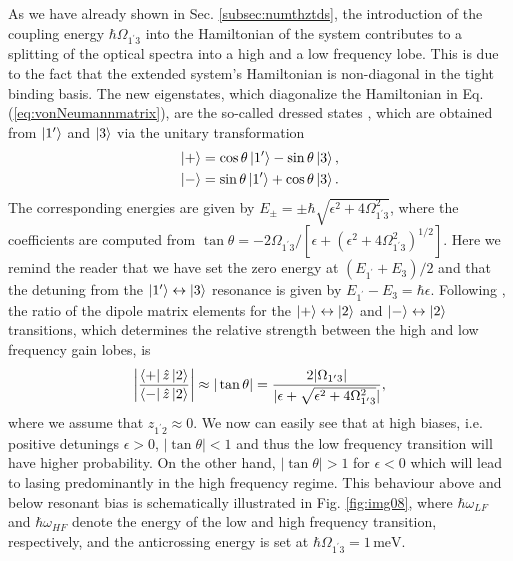 \documentclass[10pt,letterpaper]{article}%
\begin{document}
\begin{appendices}
As we have already shown in Sec. \ref{subsec:numthztds}, the introduction of
the coupling energy $\hbar\Omega_{1^{\prime}3}$ into the Hamiltonian of the
system contributes to a splitting of the optical spectra into a high and a low
frequency lobe. This is due to the fact that the extended system's Hamiltonian
is non-diagonal in the tight binding basis. The new eigenstates, which
diagonalize the Hamiltonian in Eq. (\ref{eq:vonNeumannmatrix}), are the
so-called dressed states \cite{callebaut2005importance,dupont2010simplified},
which are obtained from $\Ket{1'}$ and $\Ket{3}$ via the unitary
transformation
\begin{align}
\Ket{+} &  =\cos\theta\Ket{1'}-\sin\theta\Ket{3}%
,\nonumber\label{eq:dressedstates}\\
\Ket{-} &  =\sin\theta\Ket{1'}+\cos\theta\Ket{3}.
\end{align}
The corresponding energies are given by $E_{\pm}=\pm\hbar\sqrt{\epsilon
^{2}+4\Omega_{1^{\prime}3}^{2}}$, where the coefficients are computed from
$\tan\theta=-2\Omega_{1^{\prime}3}/[\epsilon+\left(  \epsilon^{2}%
+4\Omega_{1^{\prime}3}^{2}\right)  ^{1/2}].$ Here we remind the reader that we
have set the zero energy at $(E_{1^{\prime}}+E_{3})/2$ and that the detuning
from the $\Ket{1^{\prime}}\leftrightarrow\Ket{3}$ resonance is given by
$E_{1^{\prime}}-E_{3}=\hbar\epsilon$. Following \cite{dupont2010simplified},
the ratio of the dipole matrix elements for the $\Ket{+}\leftrightarrow\Ket
{2}$ and $\Ket{-}\leftrightarrow\Ket{2}$ transitions, which determines the
relative strength between the high and low frequency gain lobes, is
\[
\left|  \frac{\Bra{+}\hat{z}\Ket{2}}{\Bra{-}\hat{z}\Ket{2}}\right|
\approx|\tan\theta|=\frac{2|\Omega_{1^{\prime}3}|}{|\epsilon+\sqrt
{\epsilon^{2}+4\Omega_{1^{\prime}3}^{2}}|},
\]
where we assume that $z_{1^{\prime}2}\approx0$. We now can easily see that at
high biases, i.e. positive detunings $\epsilon>0$, $|\tan\theta|<1$ and thus
the low frequency transition will have higher probability. On the other hand,
$|\tan\theta|>1$ for $\epsilon<0$ which will lead to lasing predominantly in
the high frequency regime. This behaviour above and below resonant bias is
schematically illustrated in Fig. \ref{fig:img08}, where $\hbar\omega_{LF}$
and $\hbar\omega_{HF}$ denote the energy of the low and high frequency
transition, respectively, and the anticrossing energy is set at $\hbar
\Omega_{1^{\prime}3}=1{\,}\mathrm{meV}$. \label{sec:biasdependence}
\begin{figure}[h]
\begin{center}

\end{center}
\end{figure}
\end{appendices}
\end{document}
